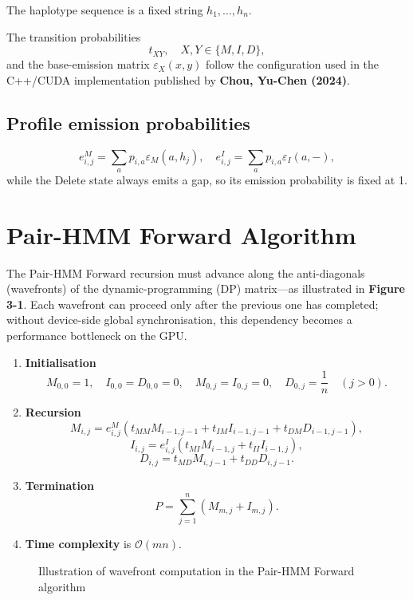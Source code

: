 \documentclass[12pt]{report}
\begin{document}
The haplotype sequence is a fixed string $h_1, \dots, h_n$.

The transition probabilities
\[
t_{XY}, \quad X,Y \in \{M,I,D\},
\]
and the base-emission matrix $\varepsilon_X(x,y)$ follow the configuration used in the C++/CUDA implementation published by \textbf{Chou, Yu-Chen (2024)}.

\subsection{Profile emission probabilities}
\[
e_{i,j}^M = \sum_a p_{i,a} \varepsilon_M(a, h_j), \quad e_{i,j}^I = \sum_a p_{i,a} \varepsilon_I(a, -),
\]
while the Delete state always emits a gap, so its emission probability is fixed at 1.

\section{Pair-HMM Forward Algorithm}
The Pair-HMM Forward recursion must advance along the anti-diagonals (wavefronts) of the dynamic-programming (DP) matrix—as illustrated in \textbf{Figure 3-1}. Each wavefront can proceed only after the previous one has completed; without device-side global synchronisation, this dependency becomes a performance bottleneck on the GPU.

\begin{enumerate}
    \item \textbf{Initialisation}
    \[
    M_{0,0} = 1, \quad I_{0,0} = D_{0,0} = 0, \quad M_{0,j} = I_{0,j} = 0, \quad D_{0,j} = \frac{1}{n} \quad (j > 0).
    \]
    \item \textbf{Recursion}
    \[
    M_{i,j} = e_{i,j}^M (t_{MM} M_{i-1,j-1} + t_{IM} I_{i-1,j-1} + t_{DM} D_{i-1,j-1}),
    \]
    \[
    I_{i,j} = e_{i,j}^I (t_{MI} M_{i-1,j} + t_{II} I_{i-1,j}),
    \]
    \[
    D_{i,j} = t_{MD} M_{i,j-1} + t_{DD} D_{i,j-1}.
    \]
    \item \textbf{Termination}
    \[
    P = \sum_{j=1}^n (M_{m,j} + I_{m,j}).
    \]
    \item \textbf{Time complexity} is $\mathcal{O}(mn)$.
\end{enumerate}

\begin{figure}[h]
    \caption{Illustration of wavefront computation in the Pair-HMM Forward algorithm}
    \label{fig:wavefront}
\end{figure}
\end{document}
